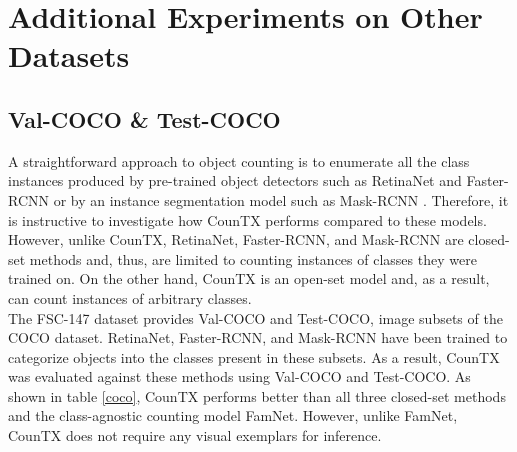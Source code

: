 \documentclass{bmvc2k}
\begin{document}
 \newpage \section{Additional Experiments on Other Datasets}
\label{sec:additional_datasets}

\subsection{Val-COCO \& Test-COCO}
A straightforward approach to object counting is to enumerate all the class instances produced by pre-trained object detectors such as RetinaNet \cite{retina-net} and Faster-RCNN \cite{faster-rcnn} or by an instance segmentation model such as Mask-RCNN \cite{mask-rcnn}. Therefore, it is instructive to investigate how CounTX performs compared to these models. However, unlike CounTX, RetinaNet, Faster-RCNN, and Mask-RCNN are closed-set methods and, thus, are limited to counting instances of classes they were trained on. On the other hand, CounTX is an open-set model and, as a result, can count instances of arbitrary classes.\\

The FSC-147 \cite{m_Ranjan-etal-CVPR21} dataset provides Val-COCO and Test-COCO, image subsets of the COCO \cite{Lin2014MicrosoftCC} dataset. RetinaNet, Faster-RCNN, and Mask-RCNN have been trained to categorize objects into the classes present in these subsets. As a result, CounTX was evaluated against these methods using Val-COCO and Test-COCO. As shown in table \ref{coco}, CounTX performs better than all three closed-set methods and the class-agnostic counting model FamNet. However, unlike FamNet, CounTX does not require any visual exemplars for inference.
\end{document}
